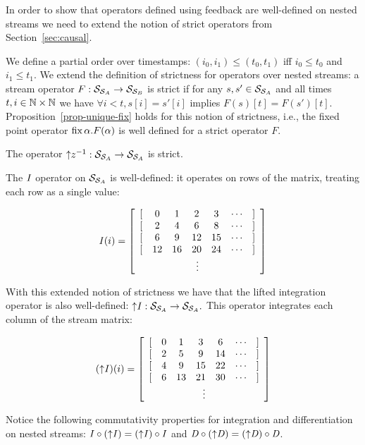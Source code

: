In order to show that operators defined using feedback are well-defined on
nested streams we need to extend the notion of strict operators from Section~\ref{sec:causal}.

We define a partial order over timestamps: $(i_0, i_1)
\leq (t_0, t_1)$ iff $i_0 \leq t_0$ and $i_1 \leq t_1$.  We extend the
definition of strictness for operators over nested streams: a stream operator
$F: \mathcal{S}_{\mathcal{S}_{A}} \to \mathcal{S}_{\mathcal{S}_{B}}$ is strict if for any $s, s' \in
\mathcal{S}_{\mathcal{S}_{A}}$ and all times $t, i \in \mathbb{N} \times \mathbb{N}$ we have $\forall i <
t, s[i] = s'[i]$ implies $F(s)[t] = F(s')[t]$.
Proposition~\ref{prop-unique-fix} holds for this notion of strictness, i.e., the fixed point operator $\mbox{fix}\,\alpha.F(\alpha)$ is well defined for a strict operator $F$.

\begin{proposition}\label{prop-liftz}
The operator ${\uparrow}z^{-1}: \mathcal{S}_{\mathcal{S}_{A}} \to \mathcal{S}_{\mathcal{S}_{A}}$ is strict.
\end{proposition}

The $\mathit{I}$ operator on $\mathcal{S}_{\mathcal{S}_{A}}$ is well-defined: it operates on rows
of the matrix, treating each row as a single value:

$$\I(i) = \ssa{0 1 2 3 2 4 6 8 6 9 12 15 12 16 20 24}$$

With this extended notion of strictness we have that the lifted integration operator
is also well-defined: ${\uparrow}\mathit{I}: \mathcal{S}_{\mathcal{S}_{A}} \to \mathcal{S}_{\mathcal{S}_{A}}.$
This operator integrates each column of the stream matrix:

$$(\lift{\I})(i) = \ssa{0 1 3 6 2 5 9 14 4 9 15 22 6 13 21 30}$$

Notice the following commutativity properties for integration and differentiation 
on nested streams: $\mathit{I} \circ ({\uparrow}\mathit{I}) = ({\uparrow}\mathit{I}) \circ \mathit{I}$ and 
$\mathit{D} \circ ({\uparrow}\mathit{D}) = ({\uparrow}\mathit{D}) \circ \mathit{D}$.

